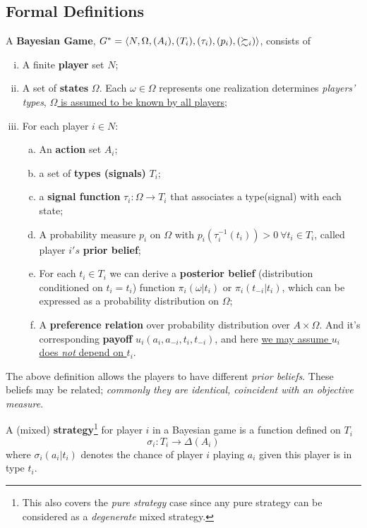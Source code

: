 \documentclass[11pt]{article}
\begin{document}
		\subsection{Formal Definitions}
			\begin{definition} A \textbf{Bayesian Game}, $G^* = \langle N, \Omega, (A_i), (T_i), (\tau_i), (p_i), (\succsim_i) \rangle$, consists of
				\begin{enumerate}[(i)]
					\item A finite \textbf{player} set $N$;
					\item A set of \textbf{states} $\Omega$. Each $\omega \in \Omega$ represents one realization determines \emph{players' types}, \ul{$\Omega$ is assumed to be known by all players};
					\item For each player $i \in N$:
					\begin{enumerate}[(a)]
						\item An \textbf{action} set $A_i$;
						\item a set of \textbf{types (signals)} $T_i$;
						\item a \textbf{signal function} $\tau_i: \Omega \to T_i$ that associates a type(signal) with each state;
						\item A probability measure $p_i$ on $\Omega$ with $p_i(\tau_i^{-1}(t_i)) > 0\ \forall t_i \in T_i$, called player $i's$ \textbf{prior belief};
						\item For each $t_i \in T_i$ we can derive a \textbf{posterior belief} (distribution conditioned on $t_i = t_i$) function $\pi_i(\omega|t_i)$ or $\pi_i(t_{-i}|t_i)$, which can be expressed as a probability distribution on $\Omega$;
						\item A \textbf{preference relation} over probability distribution over $A \times \Omega$. And it's corresponding \textbf{payoff} $u_i(a_i, a_{-i}, t_i, t_{-i})$, and here \ul{we may assume $u_i$ does \emph{not} depend on $t_i$}.
					\end{enumerate}
				\end{enumerate}
			\end{definition}
			
			\begin{remark}
				The above definition allows the players to have different \emph{prior beliefs}. These beliefs may be related; \emph{commonly they are identical, coincident with an objective measure}.
			\end{remark}
			
			\begin{definition}[Strategy]
				A (mixed) \textbf{strategy}\footnote{This also covers the \emph{pure strategy} case since any pure strategy can be considered as a \emph{degenerate} mixed strategy.} for player $i$ in a Bayesian game is a function defined on $T_i$
				\begin{equation}
					\sigma_i: T_i \to \Delta(A_i)
				\end{equation}
				where $\sigma_i(a_i|t_i)$ denotes the chance of player $i$ playing $a_i$ given this player is in type $t_i$.
			\end{definition}
			
\end{document}

